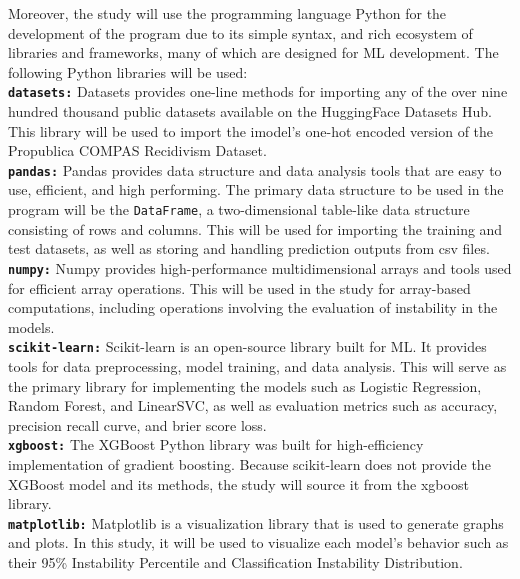 \documentclass[12pt]{article}
\begin{document}
Moreover, the study will use the programming language Python for the development of the program due to its simple syntax, and rich ecosystem of libraries and frameworks, many of which are designed for ML development. The following Python libraries will be used: \\

\textbf{\texttt{datasets:}} Datasets provides one-line methods for importing any of the over nine hundred thousand public datasets available on the HuggingFace Datasets Hub. This library will be used to import the imodel's one-hot encoded version of the Propublica COMPAS Recidivism Dataset.\\

\textbf{\texttt{pandas:}} Pandas provides data structure and data analysis tools that are easy to use, efficient, and high performing. The primary data structure to be used in the program will be the \texttt{DataFrame}, a two-dimensional table-like data structure consisting of rows and columns. This will be used for importing the training and test datasets, as well as storing and handling prediction outputs from csv files.\\

\textbf{\texttt{numpy:}} Numpy provides high-performance multidimensional arrays and tools used for efficient array operations. This will be used in the study for array-based computations, including operations involving the evaluation of instability in the models.\\

\textbf{\texttt{scikit-learn:}} Scikit-learn is an open-source library built for ML. It provides tools for data preprocessing, model training, and data analysis. This will serve as the primary library for implementing the models such as Logistic Regression, Random Forest, and LinearSVC, as well as evaluation metrics such as accuracy, precision recall curve, and brier score loss.\\

\textbf{\texttt{xgboost:}} The XGBoost Python library was built for high-efficiency implementation of gradient boosting. Because scikit-learn does not provide the XGBoost model and its methods, the study will source it from the xgboost library.\\

\textbf{\texttt{matplotlib:}} Matplotlib is a visualization library that is used to generate graphs and plots. In this study, it will be used to visualize each model's behavior such as their 95\% Instability Percentile and Classification Instability Distribution.\\
\end{document}

